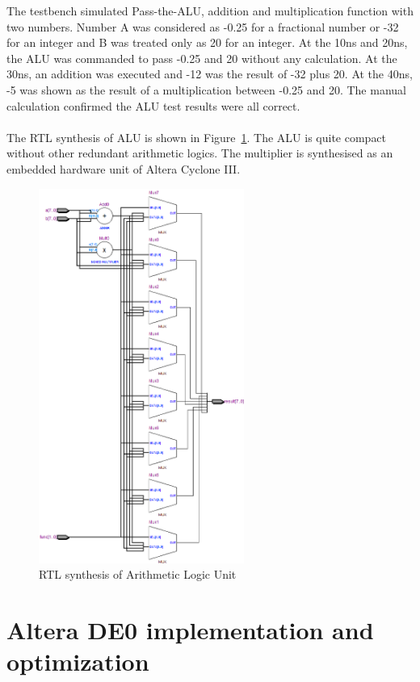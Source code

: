 The testbench simulated Pass-the-ALU, addition and multiplication function with two numbers. Number A was considered as -0.25 for a fractional number or -32 for an integer and B was treated only as 20 for an integer. At the 10ns and 20ns, the ALU was commanded to pass -0.25 and 20 without any calculation. At the 30ns, an addition was executed and -12 was the result of -32 plus 20. At the 40ns, -5 was shown as the result of a multiplication between -0.25 and 20. The manual calculation confirmed the ALU test results were all correct.\\\\
The RTL synthesis of ALU is shown in Figure~\ref{fig:ALU}. The ALU is quite compact without other redundant arithmetic logics. The multiplier is synthesised as an embedded hardware unit of Altera Cyclone III.

\begin{figure}[H]
		\centering
		\includegraphics[width = 0.6\textwidth]{Figures/aluu}		
		\caption{RTL synthesis of Arithmetic Logic Unit}
		\label {fig:ALU}
\end{figure}

\section{Altera DE0 implementation and optimization} \label{Altera DE0 implementation}
